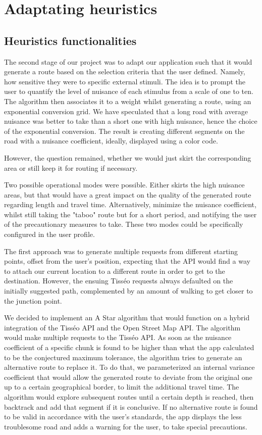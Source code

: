 \section{Adaptating heuristics}


\subsection{Heuristics functionalities}


The second stage of our project was to adapt our application such that it would generate a route based on the selection criteria that the user defined. Namely, how sensitive they were to specific external stimuli. The idea is to prompt the user to quantify the level of nuisance of each stimulus from a scale of one to ten. The algorithm then associates it to a weight whilst generating a route, using an exponential conversion grid. We have speculated that a long road with average nuisance was better to take than a short one with high nuisance, hence the choice of the exponential conversion. The result is creating different segments on the road with a nuisance coefficient, ideally, displayed using a color code.


However, the question remained, whether we would just skirt the corresponding area or still keep it for routing if necessary.


Two possible operational modes were possible. Either skirts the high nuisance areas, but that would have a great impact on the quality of the generated route regarding length and travel time. Alternatively, minimize the nuisance coefficient, whilst still taking the "taboo" route but for a short period, and notifying the user of the precautionary measures to take. These two modes could be specifically configured in the user profile.


The first approach was to generate multiple requests from different starting points, offset from the user's position, expecting that the API would find a way to attach our current location to a different route in order to get to the destination. However, the ensuing Tisséo requests always defaulted on the initially suggested path, complemented by an amount of walking to get closer to the junction point.


We decided to implement an A Star algorithm that would function on a hybrid integration of the Tisséo API and the Open Street Map API. The algorithm would make multiple requests to the Tisséo API. As soon as the nuisance coefficient of a specific chunk is found to be higher than what the app calculated to be the conjectured maximum tolerance, the algorithm tries to generate an alternative route to replace it. To do that, we parameterized an internal variance coefficient that would allow the generated route to deviate from the original one up to a certain geographical border, to limit the additional travel time. The algorithm would explore subsequent routes until a certain depth is reached, then backtrack and add that segment if it is conclusive. If no alternative route is found to be valid in accordance with the user's standards, the app displays the less troublesome road and adds a warning for the user, to take special precautions.


